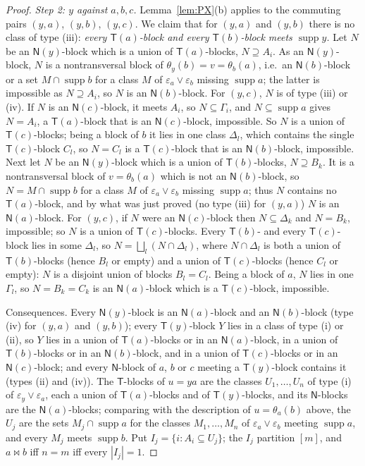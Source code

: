 \documentclass[11pt]{amsart}
\theoremstyle{definition}
\newcommand{\supp}{\operatorname{supp}}
\newcommand{\T}{\mathsf{T}}
\newcommand{\N}{\mathsf{N}}
\newcommand{\mt}{\bowtie}   %
\begin{document}
\begin{proof}
\smallskip\emph{Step 2: $y$ against $a,b,c$.} Lemma~\ref{lem:PX}(b) applies to the commuting pairs $(y,a)$, $(y,b)$, $(y,c)$. We claim that for $(y,a)$ and $(y,b)$ there is no class of type (iii): \emph{every $\T(a)$-block and every $\T(b)$-block meets $\supp y$.} Let $N$ be an $\N(y)$-block which is a union of $\T(a)$-blocks, $N\supseteq A_i$. As an $\N(y)$-block, $N$ is a nontransversal block of $\theta_y(b)=v=\theta_b(a)$, i.e.\ an $\N(b)$-block or a set $M\cap\supp b$ for a class $M$ of $\varepsilon_a\vee\varepsilon_b$ missing $\supp a$; the latter is impossible as $N\supseteq A_i$, so $N$ is an $\N(b)$-block. For $(y,c)$, $N$ is of type (iii) or (iv). If $N$ is an $\N(c)$-block, it meets $A_i$, so $N\subseteq\Gamma_i$, and $N\subseteq\supp a$ gives $N=A_i$, a $\T(a)$-block that is an $\N(c)$-block, impossible. So $N$ is a union of $\T(c)$-blocks; being a block of $b$ it lies in one class $\Delta_l$, which contains the single $\T(c)$-block $C_l$, so $N=C_l$ is a $\T(c)$-block that is an $\N(b)$-block, impossible. Next let $N$ be an $\N(y)$-block which is a union of $\T(b)$-blocks, $N\supseteq B_k$. It is a nontransversal block of $v=\theta_b(a)$ which is not an $\N(b)$-block, so $N=M\cap\supp b$ for a class $M$ of $\varepsilon_a\vee\varepsilon_b$ missing $\supp a$; thus $N$ contains no $\T(a)$-block, and by what was just proved (no type (iii) for $(y,a)$) $N$ is an $\N(a)$-block. For $(y,c)$, if $N$ were an $\N(c)$-block then $N\subseteq\Delta_k$ and $N=B_k$, impossible; so $N$ is a union of $\T(c)$-blocks. Every $\T(b)$- and every $\T(c)$-block lies in some $\Delta_l$, so $N=\bigsqcup_l(N\cap\Delta_l)$, where $N\cap\Delta_l$ is both a union of $\T(b)$-blocks (hence $B_l$ or empty) and a union of $\T(c)$-blocks (hence $C_l$ or empty): $N$ is a disjoint union of blocks $B_l=C_l$. Being a block of $a$, $N$ lies in one $\Gamma_l$, so $N=B_k=C_k$ is an $\N(a)$-block which is a $\T(c)$-block, impossible.

Consequences. Every $\N(y)$-block is an $\N(a)$-block and an $\N(b)$-block (type (iv) for $(y,a)$ and $(y,b)$); every $\T(y)$-block $Y$ lies in a class of type (i) or (ii), so $Y$ lies in a union of $\T(a)$-blocks or in an $\N(a)$-block, in a union of $\T(b)$-blocks or in an $\N(b)$-block, and in a union of $\T(c)$-blocks or in an $\N(c)$-block; and every $\N$-block of $a$, $b$ or $c$ meeting a $\T(y)$-block contains it (types (ii) and (iv)). The $\T$-blocks of $u=ya$ are the classes $U_1,\dots,U_n$ of type (i) of $\varepsilon_y\vee\varepsilon_a$, each a union of $\T(a)$-blocks and of $\T(y)$-blocks, and its $\N$-blocks are the $\N(a)$-blocks; comparing with the description of $u=\theta_a(b)$ above, the $U_j$ are the sets $M_j\cap\supp a$ for the classes $M_1,\dots,M_n$ of $\varepsilon_a\vee\varepsilon_b$ meeting $\supp a$, and every $M_j$ meets $\supp b$. Put $I_j=\{i:A_i\subseteq U_j\}$; the $I_j$ partition $[m]$, and $a\mt b$ iff $n=m$ iff every $|I_j|=1$.


\end{proof}
\end{document}
